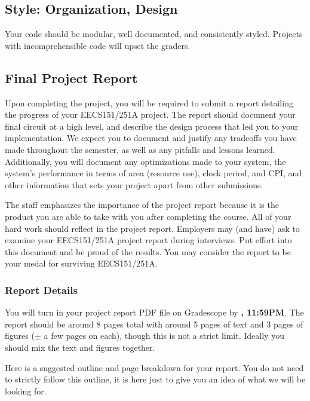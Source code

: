 \documentclass[11pt]{article}
\begin{document}
\subsection{Style: Organization, Design}
\label{style}
Your code should be modular, well documented, and consistently styled.
Projects with incomprehensible code will upset the graders.

\subsection{Final Project Report}
Upon completing the project, you will be required to submit a report detailing the progress of your EECS151/251A project.
The report should document your final circuit at a high level, and describe the design process that led you to your implementation.
We expect you to document and justify any tradeoffs you have made throughout the semester, as well as any pitfalls and lessons learned.
Additionally, you will document any optimizations made to your system, the system's performance in terms of area (resource use), clock period, and CPI, and other information that sets your project apart from other submissions.

The staff emphasizes the importance of the project report because it is the product you are able to take with you after completing the course.
All of your hard work should reflect in the project report.
Employers may (and have) ask to examine your EECS151/251A project report during interviews.
Put effort into this document and be proud of the results.
You may consider the report to be your medal for surviving EECS151/251A.

\subsubsection{Report Details}
You will turn in your project report PDF file on Gradescope by \textbf{\finalReportDueDate, 11:59PM}.
The report should be around 8 pages total with around 5 pages of text and 3 pages of figures ($\pm$ a few pages on each), though this is not a strict limit.
Ideally you should mix the text and figures together.

Here is a suggested outline and page breakdown for your report.
You do not need to strictly follow this outline, it is here just to give you an idea of what we will be looking for.
\end{document}
